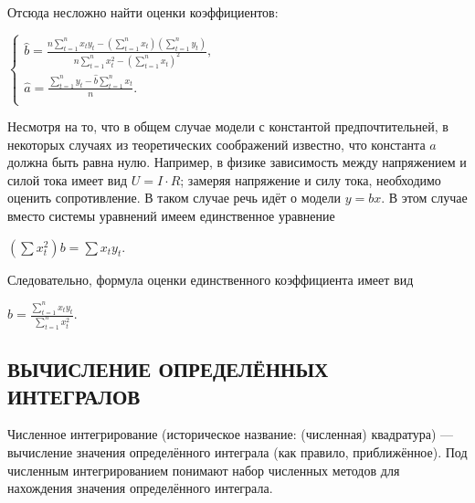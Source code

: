 \documentclass[a4paper]{article}
\begin{document}
{{{{{{{{Отсюда несложно найти оценки коэффициентов:

\begin{center}
    {{\(\left\{ \begin{matrix}
    {\hat{b} = \frac{n\sum\limits_{t = 1}^{n}x_{t}y_{t} - \left( {\sum\limits_{t = 1}^{n}x_{t}} \right)\left( {\sum\limits_{t = 1}^{n}y_{t}} \right)}{n\sum\limits_{t = 1}^{n}x_{t}^{2} - \left( {\sum\limits_{t = 1}^{n}x_{t}} \right)^{2}},} \\
    {\hat{a} = \frac{\sum\limits_{t = 1}^{n}y_{t} - \hat{b}\sum\limits_{t = 1}^{n}x_{t}}{n}.} \\
    \end{matrix} \right.\)}}
\end{center}

Несмотря на то, что в общем случае модели с константой предпочтительней,
в некоторых случаях из теоретических соображений известно, что константа
{{\(a\)}} должна быть равна нулю. Например, в физике зависимость между
напряжением и силой тока имеет вид {{\(U = I \cdot R\)}}; замеряя
напряжение и силу тока, необходимо оценить сопротивление. В таком случае
речь идёт о модели {{\(y = bx\)}}. В этом случае вместо системы
уравнений имеем единственное уравнение

\begin{center}
    {{\(\left( {\sum x_{t}^{2}} \right)b = \sum x_{t}y_{t}\)}}.
\end{center}

Следовательно, формула оценки единственного коэффициента имеет вид

\begin{center}
    {{\(\hat{b} = \frac{\sum\limits_{t = 1}^{n}x_{t}y_{t}}{\sum\limits_{t = 1}^{n}x_{t}^{2}}\)}}.
\end{center}




\newpage

\begin{center}
 \section{ВЫЧИСЛЕНИЕ ОПРЕДЕЛЁННЫХ ИНТЕГРАЛОВ}
\end{center}

Численное интегрирование (историческое название: (численная) квадратура) — вычисление значения определённого интеграла (как правило, приближённое). Под численным интегрированием понимают набор численных методов для нахождения значения определённого интеграла.\\

}}}}}}}}
\end{document}
